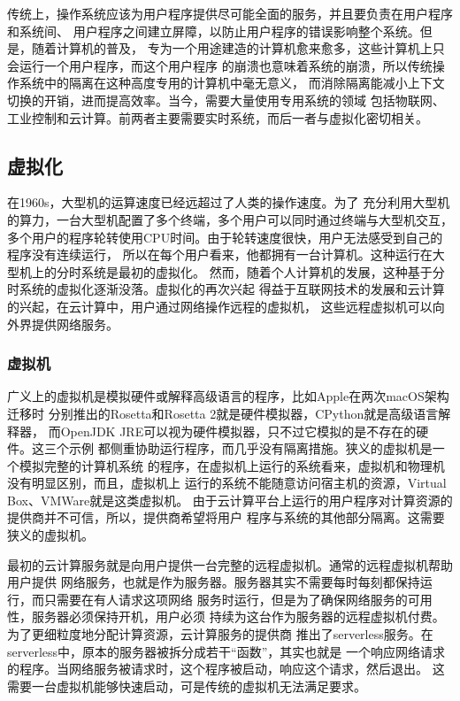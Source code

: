 \documentclass{../runikraft-report}
\begin{document}
传统上，操作系统应该为用户程序提供尽可能全面的服务，并且要负责在用户程序和系统间、
用户程序之间建立屏障，以防止用户程序的错误影响整个系统。但是，随着计算机的普及，
专为一个用途建造的计算机愈来愈多，这些计算机上只会运行一个用户程序，而这个用户程序
的崩溃也意味着系统的崩溃，所以传统操作系统中的隔离在这种高度专用的计算机中毫无意义，
而消除隔离能减小上下文切换的开销，进而提高效率。当今，需要大量使用专用系统的领域
包括物联网、工业控制和云计算。前两者主要需要实时系统，而后一者与虚拟化密切相关。

\subsection{虚拟化}
在1960s，大型机的运算速度已经远超过了人类的操作速度。为了
充分利用大型机的算力，一台大型机配置了多个终端，多个用户可以同时通过终端与大型机交互，
多个用户的程序轮转使用CPU时间。由于轮转速度很快，用户无法感受到自己的程序没有连续运行，
所以在每个用户看来，他都拥有一台计算机。这种运行在大型机上的分时系统是最初的虚拟化。
然而，随着个人计算机的发展，这种基于分时系统的虚拟化逐渐没落。虚拟化的再次兴起
得益于互联网技术的发展和云计算的兴起，在云计算中，用户通过网络操作远程的虚拟机，
这些远程虚拟机可以向外界提供网络服务。

\subsubsection{虚拟机}
广义上的虚拟机是模拟硬件或解释高级语言的程序，比如Apple在两次macOS架构迁移时
分别推出的Rosetta和Rosetta 2就是硬件模拟器，CPython就是高级语言解释器，
而OpenJDK JRE可以视为硬件模拟器，只不过它模拟的是不存在的硬件。这三个示例
都侧重协助运行程序，而几乎没有隔离措施。狭义的虚拟机是一个模拟完整的计算机系统
的程序，在虚拟机上运行的系统看来，虚拟机和物理机没有明显区别，而且，虚拟机上
运行的系统不能随意访问宿主机的资源，Virtual Box、VMWare就是这类虚拟机。
由于云计算平台上运行的用户程序对计算资源的提供商并不可信，所以，提供商希望将用户
程序与系统的其他部分隔离。这需要狭义的虚拟机。

最初的云计算服务就是向用户提供一台完整的远程虚拟机。通常的远程虚拟机帮助用户提供
网络服务，也就是作为服务器。服务器其实不需要每时每刻都保持运行，而只需要在有人请求这项网络
服务时运行，但是为了确保网络服务的可用性，服务器必须保持开机，用户必须
持续为这台作为服务器的远程虚拟机付费。为了更细粒度地分配计算资源，云计算服务的提供商
推出了serverless服务。在serverless中，原本的服务器被拆分成若干“函数”，其实也就是
一个响应网络请求的程序。当网络服务被请求时，这个程序被启动，响应这个请求，然后退出。
这需要一台虚拟机能够快速启动，可是传统的虚拟机无法满足要求。
\end{document}
